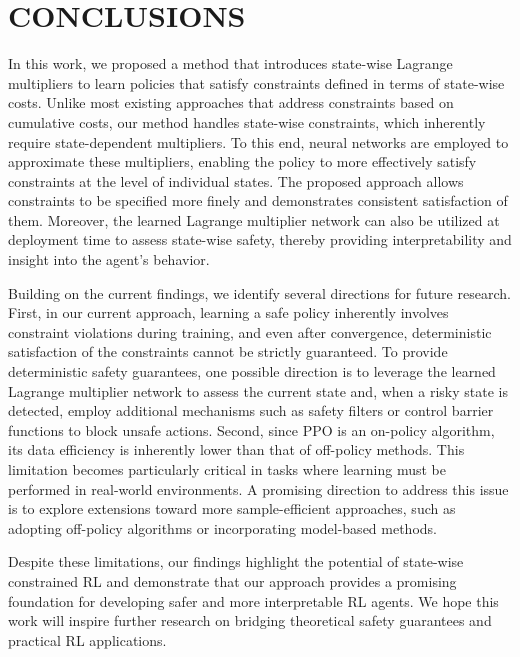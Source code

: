 \section{CONCLUSIONS}

In this work, we proposed a method that introduces state-wise Lagrange multipliers to learn policies that satisfy constraints defined in terms of state-wise costs.
Unlike most existing approaches that address constraints based on cumulative costs, our method handles state-wise constraints, which inherently require state-dependent multipliers.
To this end, neural networks are employed to approximate these multipliers, enabling the policy to more effectively satisfy constraints at the level of individual states.
The proposed approach allows constraints to be specified more finely and demonstrates consistent satisfaction of them.
Moreover, the learned Lagrange multiplier network can also be utilized at deployment time to assess state-wise safety, thereby providing interpretability and insight into the agent’s behavior.

Building on the current findings, we identify several directions for future research.
First, in our current approach, learning a safe policy inherently involves constraint violations during training, and even after convergence, deterministic satisfaction of the constraints cannot be strictly guaranteed. 
To provide deterministic safety guarantees, one possible direction is to leverage the learned Lagrange multiplier network to assess the current state and, when a risky state is detected, employ additional mechanisms such as safety filters or control barrier functions to block unsafe actions.
Second, since PPO is an on-policy algorithm, its data efficiency is inherently lower than that of off-policy methods.
This limitation becomes particularly critical in tasks where learning must be performed in real-world environments.
A promising direction to address this issue is to explore extensions toward more sample-efficient approaches, such as adopting off-policy algorithms or incorporating model-based methods.

Despite these limitations, our findings highlight the potential of state-wise constrained RL and demonstrate that our approach provides a promising foundation for developing safer and more interpretable RL agents. 
We hope this work will inspire further research on bridging theoretical safety guarantees and practical RL applications.